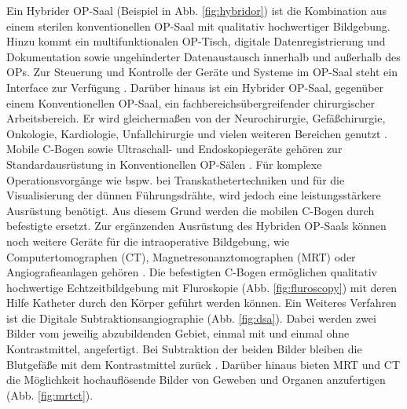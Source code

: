 Ein Hybrider OP-Saal (Beispiel in Abb. \ref{fig:hybridor}) ist die Kombination aus einem sterilen konventionellen OP-Saal mit qualitativ hochwertiger Bildgebung. Hinzu kommt ein multifunktionalen OP-Tisch, digitale Datenregistrierung und Dokumentation sowie ungehinderter Datenaustausch innerhalb und außerhalb des OPs. Zur Steuerung und Kontrolle der Geräte und Systeme im OP-Saal steht ein Interface zur Verfügung \cite{HybriderVsKonventioneller,KarlStorz}. Darüber hinaus ist ein Hybrider OP-Saal, gegenüber einem Konventionellen OP-Saal, ein fachbereichsübergreifender chirurgischer Arbeitsbereich. Er wird gleichermaßen von der Neurochirurgie, Gefäßchirurgie, Onkologie, Kardiologie, Unfallchirurgie und vielen weiteren Bereichen genutzt \cite{Getinge}.\\
Mobile C-Bogen sowie Ultraschall- und Endoskopiegeräte gehören zur Standardausrüstung in Konventionellen OP-Sälen \cite{TechnicalConsiderations}. Für komplexe Operationsvorgänge wie bspw. bei Transkathetertechniken und für die Visualisierung der dünnen Führungsdrähte, wird jedoch eine leistungsstärkere Ausrüstung benötigt. Aus diesem Grund werden die mobilen C-Bogen durch befestigte ersetzt. Zur ergänzenden Ausrüstung des Hybriden OP-Saals können noch weitere Geräte für die intraoperative Bildgebung, wie Computertomographen (CT), Magnetresonanztomographen (MRT) oder Angiografieanlagen gehören \cite{OPderZukunft}. 
Die befestigten C-Bogen ermöglichen qualitativ hochwertige Echtzeitbildgebung mit Fluroskopie (Abb. \ref{fig:fluroscopy}) mit deren Hilfe Katheter durch den Körper geführt werden können. Ein Weiteres Verfahren ist die Digitale Subtraktionsangiographie (Abb. \ref{fig:dsa}). Dabei werden zwei Bilder vom jeweilig abzubildenden Gebiet, einmal mit und einmal ohne Kontrastmittel, angefertigt. Bei Subtraktion der beiden Bilder bleiben die Blutgefäße mit dem Kontrastmittel zurück \cite{CurrentAndFuture}. Darüber hinaus bieten MRT und CT die Möglichkeit hochauflösende Bilder von Geweben und Organen anzufertigen (Abb. \ref{fig:mrtct}).\\

